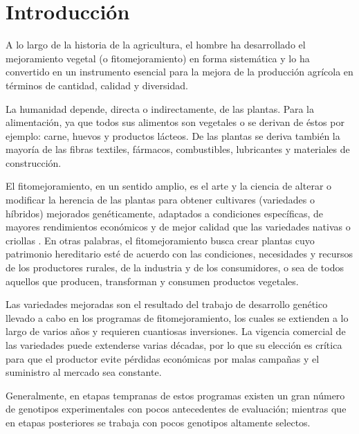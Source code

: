 

\chapter{Introducción}

A lo largo de la historia de la agricultura, el hombre ha desarrollado el mejoramiento vegetal (o fitomejoramiento) en forma sistemática y lo ha convertido en un instrumento esencial para la mejora de la producción agrícola en términos de cantidad, calidad y diversidad.  

La humanidad depende, directa o indirectamente, de las plantas. Para la alimentación, ya que todos sus alimentos son vegetales o se derivan de éstos por ejemplo: carne, huevos y productos lácteos. De las plantas se deriva también la mayoría de las fibras textiles, fármacos, combustibles, lubricantes y materiales de construcción.

El fitomejoramiento, en un sentido amplio, es el arte y la ciencia de alterar o modificar la herencia de las plantas para obtener cultivares (variedades o híbridos) mejorados genéticamente, adaptados a condiciones específicas, de mayores rendimientos económicos y de mejor calidad que las variedades nativas o criollas \citep{Allard67}. En otras palabras, el fitomejoramiento busca crear plantas cuyo patrimonio hereditario esté de acuerdo con las condiciones, necesidades y recursos de los productores rurales, de la industria y de los consumidores, o sea de todos aquellos que producen, transforman y consumen productos vegetales. 

Las variedades mejoradas son el resultado del trabajo de desarrollo genético llevado a cabo en los programas de fitomejoramiento, los cuales se extienden a lo largo de varios años y requieren cuantiosas inversiones. La vigencia comercial de las variedades puede extenderse varias décadas, por lo que su elección es crítica para que el productor evite pérdidas económicas por malas campañas y el suministro al mercado sea constante. 

Generalmente, en etapas tempranas de estos programas existen un gran número de genotipos experimentales con pocos antecedentes de evaluación; mientras que en etapas posteriores  se trabaja con pocos genotipos altamente selectos. 

